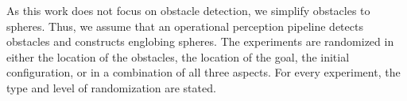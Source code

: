 As this work does not focus on obstacle detection, we simplify
obstacles to spheres. Thus, we assume that an operational perception
pipeline detects obstacles and constructs englobing spheres.
The experiments are randomized in either the location of the obstacles, the location of the
goal, the initial configuration, or in a combination of all three aspects.
For every experiment, the type and level of randomization are stated.








